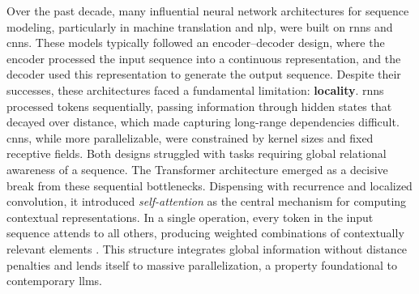 Over the past decade, many influential neural network architectures for
sequence modeling, particularly in machine translation and \gls{nlp}, were built
on \glspl{rnn} and \glspl{cnn}. These models typically followed an
encoder–decoder design, where the encoder processed the input sequence into a
continuous representation, and the decoder used this representation to
generate the output sequence. Despite their successes, these architectures faced a fundamental limitation:
\textbf{locality}. \glspl{rnn} processed tokens sequentially, passing information
through hidden states that decayed over distance, which made capturing
long-range dependencies difficult. \glspl{cnn}, while more parallelizable, were
constrained by \gls{kernel} sizes and fixed receptive fields. Both designs
struggled with tasks requiring global relational awareness of a sequence. The Transformer architecture \parencite{vaswani2017a} emerged as a decisive
break from these sequential bottlenecks. Dispensing with recurrence and
localized convolution, it introduced \emph{self-attention} as the central
mechanism for computing contextual representations. In a single operation, every
\gls{token} in the input sequence attends to all others, producing
weighted combinations of contextually relevant elements \parencite[4]{vaswani2017a}.
This structure integrates global information without distance penalties and
lends itself to massive parallelization, a property foundational to
contemporary \glspl{llm}.



